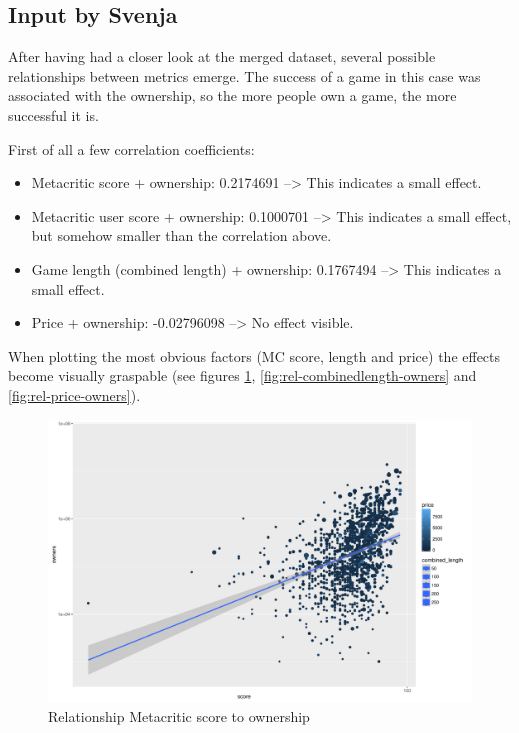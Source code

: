 \subsection{Input by Svenja}

After having had a closer look at the merged dataset, several possible relationships between metrics emerge. The success of a game in this case was associated with the ownership, so the more people own a game, the more successful it is.

First of all a few correlation coefficients:
\begin{itemize}
	\item Metacritic score + ownership: 0.2174691 --> This indicates a small effect.
	\item Metacritic user score + ownership: 0.1000701 --> This indicates a small effect, but somehow smaller than the correlation above.
	\item Game length (combined length) + ownership: 0.1767494 --> This indicates a small effect. 
	\item Price + ownership: -0.02796098 --> No effect visible.
\end{itemize}

When plotting the most obvious factors (MC score, length and price) the effects become visually graspable (see figures \ref{fig:rel-score-owners}, \ref{fig:rel-combinedlength-owners} and \ref{fig:rel-price-owners}).

\begin{figure}[!t]
	\centering
	\includegraphics[width=1.0\columnwidth]{images/rel-score-owners.pdf}
	\caption{Relationship Metacritic score to ownership}
\label{fig:rel-score-owners}
\end{figure}

